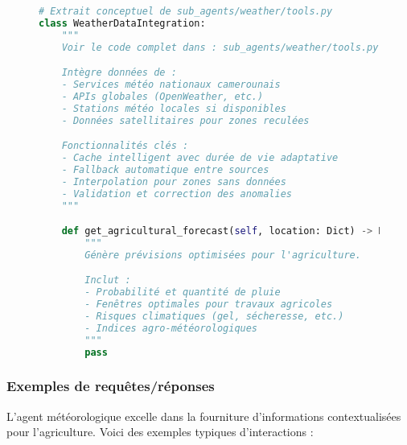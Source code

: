 \begin{figure}[H]
\centering
\begin{lstlisting}[language=Python, caption=Pattern d'intégration météo (exemple simplifié)]
# Extrait conceptuel de sub_agents/weather/tools.py
class WeatherDataIntegration:
    """
    Voir le code complet dans : sub_agents/weather/tools.py

    Intègre données de :
    - Services météo nationaux camerounais
    - APIs globales (OpenWeather, etc.)
    - Stations météo locales si disponibles
    - Données satellitaires pour zones reculées

    Fonctionnalités clés :
    - Cache intelligent avec durée de vie adaptative
    - Fallback automatique entre sources
    - Interpolation pour zones sans données
    - Validation et correction des anomalies
    """

    def get_agricultural_forecast(self, location: Dict) -> Dict:
        """
        Génère prévisions optimisées pour l'agriculture.

        Inclut :
        - Probabilité et quantité de pluie
        - Fenêtres optimales pour travaux agricoles
        - Risques climatiques (gel, sécheresse, etc.)
        - Indices agro-météorologiques
        """
        pass
\end{lstlisting}
\end{figure}

\subsubsection{Exemples de requêtes/réponses}

L'agent météorologique excelle dans la fourniture d'informations contextualisées pour l'agriculture. Voici des exemples typiques d'interactions :

